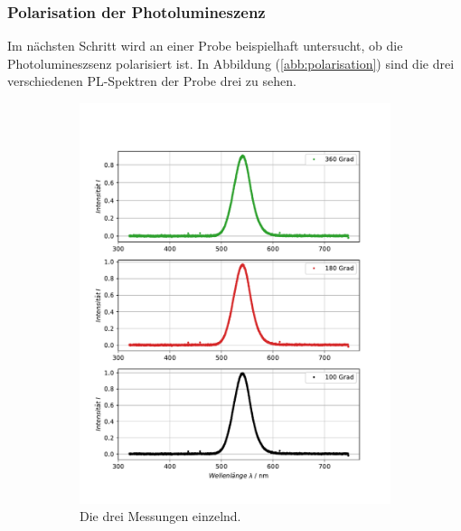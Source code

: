 \subsubsection{Polarisation der Photolumineszenz}
Im n\"{a}chsten Schritt wird an einer Probe beispielhaft untersucht, ob die Photolumineszsenz polarisiert ist.
In Abbildung (\ref{abb:polarisation}) sind die drei verschiedenen PL-Spektren der Probe drei zu sehen.
\begin{figure}[H]
\centering
	\begin{subfigure}[t]{0.4\textwidth}
	\includegraphics[width=\textwidth]{Plots/aufgabe1b_korrek.pdf}
	\caption{Die drei Messungen einzelnd.}
	\label{abb:polarisation_einzelnd}
	\end{subfigure}
	~
	\begin{subfigure}[t]{0.4\textwidth}

\end{subfigure}
\end{figure}

